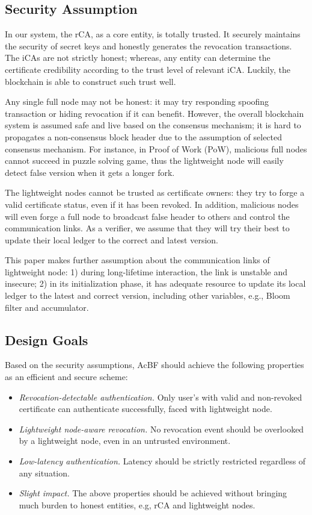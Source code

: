 \documentclass[conference]{IEEEtran}
\begin{document}
\subsection{Security Assumption}
In our system, the rCA, as a core entity, is totally trusted. It securely maintains the security of secret keys and honestly generates the revocation transactions. The iCAs are not strictly honest; whereas, any entity can determine the certificate credibility according to the trust level of relevant iCA. Luckily, the blockchain is able to construct such trust well. 

Any single full node may not be honest: it may try responding spoofing transaction or hiding revocation if it can benefit. However, the overall blockchain system is assumed safe and live based on the consensus mechanism; it is hard to propagates a non-consensus block header due to the assumption of selected consensus mechanism. For instance, in Proof of Work (PoW), malicious full nodes cannot succeed in puzzle solving game, thus the lightweight node will easily detect false version when it gets a longer fork.

The lightweight nodes cannot be trusted as certificate owners: they try to forge a valid certificate status, even if it has been revoked. In addition, malicious nodes will even forge a full node to broadcast false header to others and control the communication links. As a verifier, we assume that they will try their best to update their local ledger to the correct and latest version. 

This paper makes further assumption about the communication links of lightweight node: 1) during long-lifetime interaction, the link is unstable and insecure; 2) in its initialization phase, it has adequate resource to update its local ledger to the latest and correct version, including other variables, e.g., Bloom filter and accumulator.

\subsection{Design Goals}
Based on the security assumptions, AcBF should achieve the following properties as an efficient and secure scheme:  
\begin{itemize}
	\item \textit{Revocation-detectable authentication.} Only user's with valid and non-revoked certificate can authenticate successfully, faced with lightweight node.
	\item \textit{Lightweight node-aware revocation.} No revocation event should be overlooked by a lightweight node, even in an untrusted environment. 
	\item \textit{Low-latency authentication.} Latency should be strictly restricted regardless of any situation. 
	\item \textit{Slight impact.} The above properties should be achieved without bringing much burden to honest entities, e.g, rCA and lightweight nodes.
\end{itemize}
\end{document}
